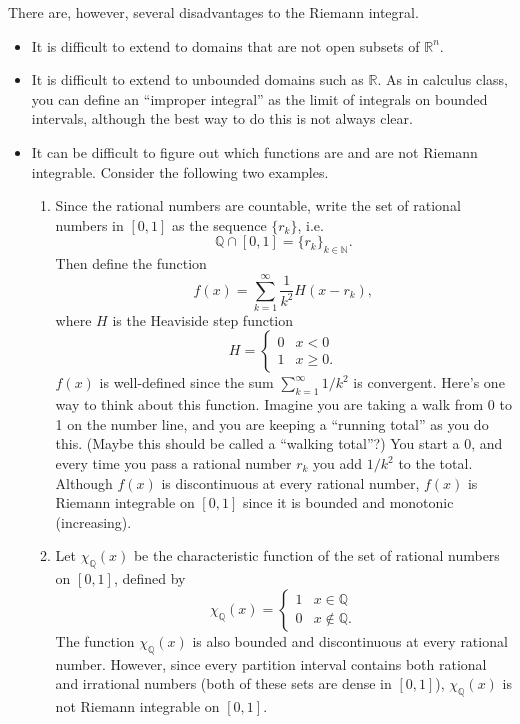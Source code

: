 \documentclass[12pt]{amsart}         %
\theoremstyle{remark}
\newcommand{\N}{\mathbb{N}}
\newcommand{\R}{\mathbb{R}}
\newcommand{\Q}{\mathbb{Q}}
\begin{document}
There are, however, several disadvantages to the Riemann integral.

\begin{itemize}
    \item It is difficult to extend to domains that are not open subsets of $\R^n$.
    \item It is difficult to extend to unbounded domains such as $\R$. As in calculus class, you can define an ``improper integral'' as the limit of integrals on bounded intervals, although the best way to do this is not always clear.
    \item It can be difficult to figure out which functions are and are not Riemann integrable.
    Consider the following two examples.
    \begin{enumerate}
        \item Since the rational numbers are countable, write the set of rational numbers in $[0, 1]$ as the sequence $\{ r_k \}$, i.e.
        \[
        \Q \cap [0, 1] = \{ r_k \}_{k \in \N}.
        \]
        Then define the function
        \[
        f(x) = \sum_{k=1}^\infty \frac{1}{k^2}H(x - r_k),
        \]
        where $H$ is the Heaviside step function
        \[
        H = \begin{cases}
        0 & x < 0 \\
        1 & x \geq 0.
        \end{cases}
        \]
        $f(x)$ is well-defined since the sum $\sum_{k=1}^\infty 1/k^2$ is convergent. Here's one way to think about this function. Imagine you are taking a walk from 0 to 1 on the number line, and you are keeping a ``running total'' as you do this. (Maybe this should be called a ``walking total''?) You start a 0, and every time you pass a rational number $r_k$ you add $1/k^2$ to the total. Although $f(x)$ is discontinuous at every rational number, $f(x)$ is Riemann integrable on $[0, 1]$ since it is bounded and monotonic (increasing).
        \item Let $\chi_\Q(x)$ be the characteristic function of the set of rational numbers on $[0, 1]$, defined by
        \[
        \chi_\Q(x) = 
        \begin{cases}
        1 & x \in \Q \\
        0 & x \notin \Q.
        \end{cases}
        \]
        The function $\chi_\Q(x)$ is also bounded and discontinuous at every rational number. However, since every partition interval contains both rational and irrational numbers (both of these sets are dense in $[0,1]$), $\chi_\Q(x)$ is not Riemann integrable on $[0, 1]$.
    \end{enumerate}
    

\end{itemize}
\end{document}
